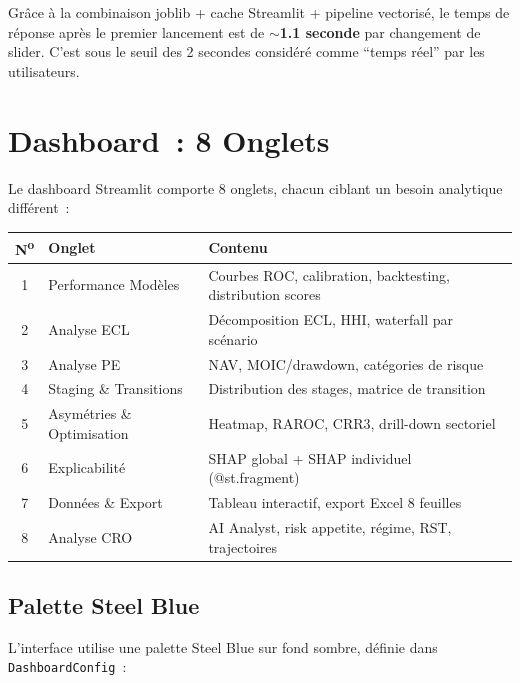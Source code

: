 \documentclass[12pt,a4paper]{article}
\begin{document}
\begin{interpretbox}
Gr\^ace \`a la combinaison joblib + cache Streamlit + pipeline vectoris\'e, le temps de r\'eponse apr\`es le premier lancement est de \textbf{$\sim$1.1 seconde} par changement de slider. C'est sous le seuil des 2 secondes consid\'er\'e comme ``temps r\'eel'' par les utilisateurs.
\end{interpretbox}


\section{Dashboard~: 8 Onglets}
\label{sec:dashboard}

Le dashboard Streamlit comporte 8 onglets, chacun ciblant un besoin analytique diff\'erent~:

\begin{center}
\begin{tabular}{clp{6.5cm}}
\toprule
\textbf{N\textsuperscript{o}} & \textbf{Onglet} & \textbf{Contenu} \\
\midrule
1 & Performance Mod\`eles & Courbes ROC, calibration, backtesting, distribution scores \\
2 & Analyse ECL & D\'ecomposition ECL, HHI, waterfall par sc\'enario \\
3 & Analyse PE & NAV, MOIC/drawdown, cat\'egories de risque \\
4 & Staging \& Transitions & Distribution des stages, matrice de transition \\
5 & Asym\'etries \& Optimisation & Heatmap, RAROC, CRR3, drill-down sectoriel \\
6 & Explicabilit\'e & SHAP global + SHAP individuel (@st.fragment) \\
7 & Donn\'ees \& Export & Tableau interactif, export Excel 8 feuilles \\
8 & Analyse CRO & AI Analyst, risk appetite, r\'egime, RST, trajectoires \\
\bottomrule
\end{tabular}
\end{center}

\subsection{Palette Steel Blue}

L'interface utilise une palette Steel Blue sur fond sombre, d\'efinie dans \texttt{DashboardConfig}~:
\end{document}
